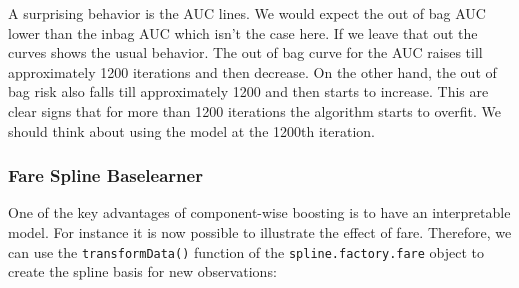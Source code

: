 \documentclass[]{article}
\newenvironment{Shaded}{\begin{snugshade}}{\end{snugshade}}
\newcommand{\KeywordTok}[1]{\textcolor[rgb]{0.13,0.29,0.53}{\textbf{#1}}}
\newcommand{\DataTypeTok}[1]{\textcolor[rgb]{0.13,0.29,0.53}{#1}}
\newcommand{\DecValTok}[1]{\textcolor[rgb]{0.00,0.00,0.81}{#1}}
\newcommand{\StringTok}[1]{\textcolor[rgb]{0.31,0.60,0.02}{#1}}
\newcommand{\OperatorTok}[1]{\textcolor[rgb]{0.81,0.36,0.00}{\textbf{#1}}}
\newcommand{\NormalTok}[1]{#1}
\begin{document}
A surprising behavior is the AUC lines. We would expect the out of bag
AUC lower than the inbag AUC which isn't the case here. If we leave that
out the curves shows the usual behavior. The out of bag curve for the
AUC raises till approximately 1200 iterations and then decrease. On the
other hand, the out of bag risk also falls till approximately 1200 and
then starts to increase. This are clear signs that for more than 1200
iterations the algorithm starts to overfit. We should think about using
the model at the 1200th iteration.

\subsubsection{Fare Spline Baselearner}\label{fare-spline-baselearner}

One of the key advantages of component-wise boosting is to have an
interpretable model. For instance it is now possible to illustrate the
effect of fare. Therefore, we can use the \texttt{transformData()}
function of the \texttt{spline.factory.fare} object to create the spline
basis for new observations:

\begin{Shaded}
\end{Shaded}
\end{document}
